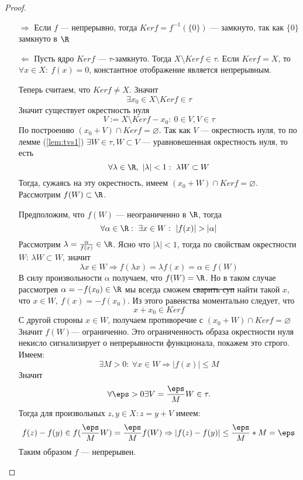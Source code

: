 \begin{proof}
	\hfill
	\begin{enumerate}
		\item[$\Rightarrow$] Если $f$ --- непрерывно, тогда $Ker f = f^{-1}(\{0\})$ --- замкнуто, так как $\{0\}$ замкнуто в $\R$ 
		\item[$\Leftarrow$] Пусть ядро $Ker f$ --- $\tau$-замкнуто. Тогда $ X \setminus Ker f \in \tau$. Если $Ker f  = X$, то $\forall x \in X : \ f(x) = 0$, константное отображение является непрерывным. 
		
		Теперь считаем, что $Ker f \neq X$. Значит 
		$$
		\exists x_0 \in X \setminus Ker f \in \tau
		$$
		Значит существует окрестность нуля $$V:= X\setminus Ker f - x_0: \  0 \in V, V \in \tau$$ По построению $(x_0 + V) \cap Ker f = \varnothing$. Так как $V$ --- окрестность нуля, то по лемме (\ref{lem:tvs1}) $\exists W \in \tau, W \subset V$ --- уравновешенная окрестность нуля, то есть 
		$$\forall \lambda\in \R, \ |\lambda| < 1:\ \lambda W \subset W$$
		Тогда, сужаясь на эту окрестность, имеем $(x_0 + W)\cap Ker f = \varnothing$. Рассмотрим $f(W) \subset \R$.
		
		Предположим, что $f(W)$ --- неограниченно в $\R$, тогда 
			$$
			\forall \alpha \in \R : \ \exists x \in W : \ |f(x)| > |\alpha|
			$$
			Рассмотрим $\lambda = \frac{\alpha}{f(x)} \in \R$. Ясно что $|\lambda| < 1$, тогда по свойствам окрестности $W$: $\lambda W \subset W$, значит 
			$$
			\lambda x \in W \Rightarrow f( \lambda x ) = \lambda f(x) = \alpha \in f(W)
			$$
			В силу произвольности $\alpha$ получаем, что $f(W)=\R$. Но в таком случае рассмотрев $\alpha = - f(x_0) \in \R$ мы всегда сможем  \sout{сварить суп} найти такой $x$, что $x \in W, \  f(x) = - f(x_0)$. Из этого равенства моментально следует, что 
			$$
			x + x_0 \in Ker f
			$$
			С другой стороны $x \in W$, получаем противоречие с $(x_0 + W)\cap Ker f = \varnothing$
			Значит $f(W)$--- ограниченно. Это ограниченность образа окрестности нуля некисло сигнализирует о непрерывности функционала, покажем это строго. Имеем:
			$$
			\exists M > 0: \ \forall x \in W \Rightarrow |f(x)| \leq M 
			$$
			Значит 
			$$
			\forall \eps > 0 \exists V = \frac{\eps}{M}W \in \tau.
			$$
			Тогда для произвольных $z, y \in X: z = y + V$ имеем:
			$$
			f(z) - f(y) \in f(\frac{\eps}{M}W) = \frac{\eps}{M}f(W) \Rightarrow |f(z) - f(y)| \leq \frac{\eps}{M}*M = \eps 
			$$
			Таким образом $f$ --- непрерывен. 
 	\end{enumerate}
\end{proof}

